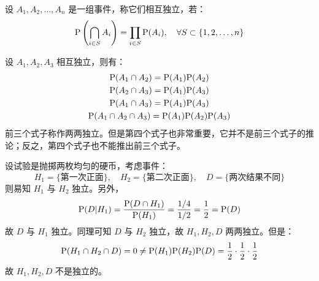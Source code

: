 \begin{definition}[一组事件的相互独立性]
设 $A_1,A_2,\ldots,A_n$ 是一组事件，称它们相互独立，若：
\[
\mathrm{P}\left(\bigcap_{i\in S}A_i\right)=\prod_{i\in S}\mathrm{P}(A_i),\quad\forall S\subset\{1,2,\ldots,n\}
\]
\end{definition}
\begin{note}[两两独立与相互独立]
设 $A_1,A_2,A_3$ 相互独立，则有：
\begin{gather*}
\mathrm{P}(A_1\cap A_2)=\mathrm{P}(A_1)\mathrm{P}(A_2)\\
\mathrm{P}(A_2\cap A_3)=\mathrm{P}(A_1)\mathrm{P}(A_3)\\
\mathrm{P}(A_1\cap A_3)=\mathrm{P}(A_1)\mathrm{P}(A_3)\\
\mathrm{P}(A_1\cap A_2\cap A_3)=\mathrm{P}(A_1)\mathrm{P}(A_2)\mathrm{P}(A_3)
\end{gather*}
前三个式子称作两两独立。但是第四个式子也非常重要，它并不是前三个式子的推论；反之，第四个式子也不能推出前三个式子。
\end{note}
\begin{example}[两两独立不能推出独立]
设试验是抛掷两枚均匀的硬币，考虑事件：
\[H_1=\{\text{第一次正面}\},\quad H_2=\{\text{第二次正面}\},\quad D=\{\text{两次结果不同}\}\]
则易知 $H_1$ 与 $H_2$ 独立。另外，
\[
\mathrm{P}(D\vert H_1)=\frac{\mathrm{P}(D\cap H_1)}{\mathrm{P}(H_1)}=\frac{1/4}{1/2}=\frac{1}{2}=\mathrm{P}(D)
\]
故 $D$ 与 $H_1$ 独立。同理可知 $D$ 与 $H_2$ 独立，故 $H_1,H_2,D$ 两两独立。但是：
\[
\mathrm{P}(H_1\cap H_2\cap D)=0\neq \mathrm{P}(H_1)\mathrm{P}(H_2)\mathrm{P}(D)=\frac{1}{2}\cdot\frac{1}{2}\cdot\frac{1}{2}
\]
故 $H_1,H_2,D$ 不是独立的。
\end{example}
